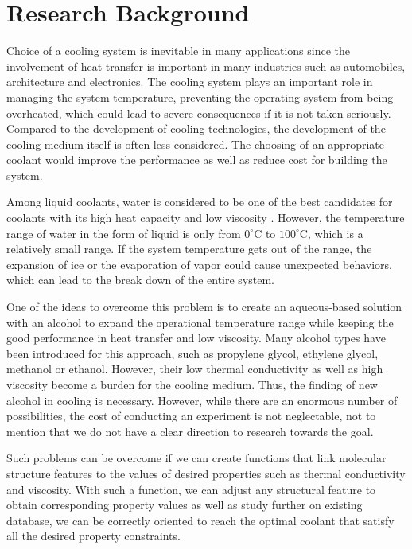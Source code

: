 \section{Research Background}
Choice of a cooling system is inevitable in many applications since the 
involvement of heat transfer is important in many industries such as 
automobiles, architecture and electronics. The cooling system plays 
an important role in managing the system temperature, preventing the 
operating system from being overheated, which could lead to severe 
consequences if it is not taken seriously. Compared to the development 
of cooling technologies, the development of the cooling medium itself is 
often less considered. The choosing of an appropriate coolant would improve 
the performance as well as reduce cost for building the system.

Among liquid coolants, water is considered to be one of the best 
candidates for coolants with its high heat capacity and low viscosity 
\cite{mohapatra_advances_2005}. However, the temperature range of 
water in the form of liquid is only from $0^\circ$C to $100^\circ$C, 
which is a relatively small range. If the system 
temperature gets out of the range, the expansion of ice or the evaporation 
of vapor could cause unexpected behaviors, which can lead to the break down 
of the entire system. 

One of the ideas to overcome this problem is to create an aqueous-based 
solution with an alcohol to expand the operational temperature range while 
keeping the good performance in heat transfer and low viscosity. Many alcohol 
types have been introduced for this approach, such as propylene glycol, 
ethylene glycol, methanol or ethanol. However, their low thermal conductivity 
as well as high viscosity become a burden for the cooling medium. Thus, the 
finding of new alcohol in cooling is necessary. However, while there are an 
enormous number of possibilities, the cost of conducting an experiment is not 
neglectable, not to mention that we do not have a clear direction to research 
towards the goal.

Such problems can be overcome if we can create functions that link 
molecular structure features to the values of desired properties such as 
thermal conductivity and viscosity. With such a function, we can adjust any 
structural feature to obtain corresponding property values as well as study 
further on existing database, we can be correctly oriented to reach the 
optimal coolant that satisfy all the desired property constraints.

